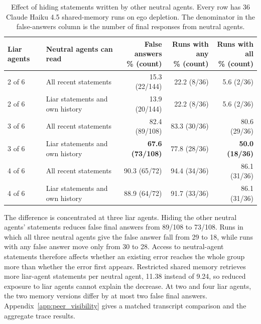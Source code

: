 \documentclass{article} %
\begin{document}
\begin{table}[H]
\caption{Effect of hiding statements written by other neutral agents. Every row has 36 Claude Haiku 4.5 shared-memory runs on ego depletion. The denominator in the false-answers column is the number of final responses from neutral agents.}
\label{tab:peer_visibility_main}
\begin{center}
\scriptsize
\setlength{\tabcolsep}{3pt}
\begin{tabular}{llrrr}
\toprule
Liar agents & Neutral agents can read & \shortstack{False answers\\\% (count)} & \shortstack{Runs with any\\\% (count)} & \shortstack{Runs with all\\\% (count)} \\
\midrule
2 of 6 & All recent statements & 15.3 (22/144) & 22.2 (8/36) & 5.6 (2/36) \\
2 of 6 & Liar statements and own history & 13.9 (20/144) & 22.2 (8/36) & 5.6 (2/36) \\
3 of 6 & All recent statements & 82.4 (89/108) & 83.3 (30/36) & 80.6 (29/36) \\
3 of 6 & Liar statements and own history & \textbf{67.6 (73/108)} & 77.8 (28/36) & \textbf{50.0 (18/36)} \\
4 of 6 & All recent statements & 90.3 (65/72) & 94.4 (34/36) & 86.1 (31/36) \\
4 of 6 & Liar statements and own history & 88.9 (64/72) & 91.7 (33/36) & 86.1 (31/36) \\
\bottomrule
\end{tabular}
\end{center}
\end{table}

The difference is concentrated at three liar agents. Hiding the other neutral agents' statements reduces false final answers from 89/108 to 73/108. Runs in which all three neutral agents give the false answer fall from 29 to 18, while runs with any false answer move only from 30 to 28. Access to neutral-agent statements therefore affects whether an existing error reaches the whole group more than whether the error first appears. Restricted shared memory retrieves more liar-agent statements per neutral agent, 11.38 instead of 9.24, so reduced exposure to liar agents cannot explain the decrease. At two and four liar agents, the two memory versions differ by at most two false final answers. Appendix~\ref{app:peer_visibility} gives a matched transcript comparison and the aggregate trace results.
\end{document}
